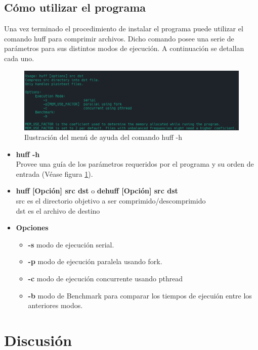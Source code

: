\documentclass{report}
\begin{document}
\subsection{Cómo utilizar el programa}
Una vez terminado el procedimiento de instalar el programa puede utilizar el comando huff para comprimir archivos. Dicho comando posee una serie de parámetros para sus distintos modos de ejecución. A continuación se detallan cada uno.

\begin{figure}[h]
    \centering
    \includegraphics[width=0.8\linewidth]{figuras/huff_ayuda.png}
    \caption{Ilustración del menú de ayuda del comando huff -h}
    \label{fig:huffayuda}
\end{figure}

\begin{itemize}
  \item \textbf{huff -h}\\ \hspace{2cm}
    Provee una guía de los parámetros requeridos por el programa y su orden de entrada (Véase figura \ref{fig:huffayuda}).
  \item \textbf{huff [Opción] src dst} o \textbf{dehuff [Opción] src dst}\\
src es el directorio objetivo a ser comprimido/descomprimido\\
dst es el archivo de destino
  \item \textbf{Opciones} 
    \begin{itemize}
      \item \textbf{-s} modo de ejecución serial.
      \item \textbf{-p} modo de ejecución paralela usando fork.
      \item \textbf{-c} modo de ejecución concurrente usando pthread
      \item \textbf{-b} modo de Benchmark para comparar los tiempos de ejecuión entre los anteriores modos.
    \end{itemize}
\end{itemize}





\section{Discusión}
\end{document}
